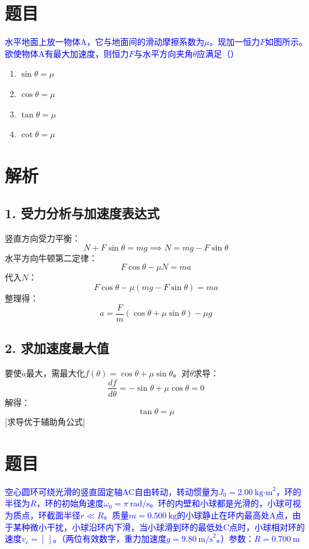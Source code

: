 \documentclass[11pt,a4paper]{article}
\begin{document}
\section*{题目}
\textcolor{blue}{水平地面上放一物体A，它与地面间的滑动摩擦系数为$\mu$。现加一恒力$F$如图所示。欲使物体A有最大加速度，则恒力$F$与水平方向夹角$\theta$应满足（）}

\begin{enumerate}
    \item[A] $\sin\theta = \mu$
    \item[B] $\cos\theta = \mu$
    \item[C] $\tan\theta = \mu$
    \item[D] $\cot\theta = \mu$
\end{enumerate}

\section*{解析}

\subsection*{1. 受力分析与加速度表达式}
竖直方向受力平衡：
\[
N + F\sin\theta = mg \implies N = mg - F\sin\theta
\]
水平方向牛顿第二定律：
\[
F\cos\theta - \mu N = ma
\]
代入$N$：
\[
F\cos\theta - \mu(mg - F\sin\theta) = ma
\]
整理得：
\[
a = \frac{F}{m}(\cos\theta + \mu\sin\theta) - \mu g
\]

\subsection*{2. 求加速度最大值}
要使$a$最大，需最大化$f(\theta)=\cos\theta + \mu\sin\theta$。对$\theta$求导：
\[
\frac{df}{d\theta} = -\sin\theta + \mu\cos\theta = 0
\]
解得：
\[
\tan\theta = \mu
\]
[求导优于辅助角公式]

\section*{题目}
\textcolor{blue}{空心圆环可绕光滑的竖直固定轴AC自由转动，转动惯量为$J_0=2.00\ \text{kg·m}^2$，环的半径为$R$，环的初始角速度$\omega_0=\pi\ \text{rad/s}$。环的内壁和小球都是光滑的，小球可视为质点，环截面半径$r\ll R$。质量$m=0.500\ \text{kg}$的小球静止在环内最高处A点，由于某种微小干扰，小球沿环内下滑，当小球滑到环的最低处C点时，小球相对环的速度$v_c=[\ ]$。（两位有效数字，重力加速度$g=9.80\ \text{m/s}^2$。）参数：$R=0.700\ \text{m}$}
\end{document}
